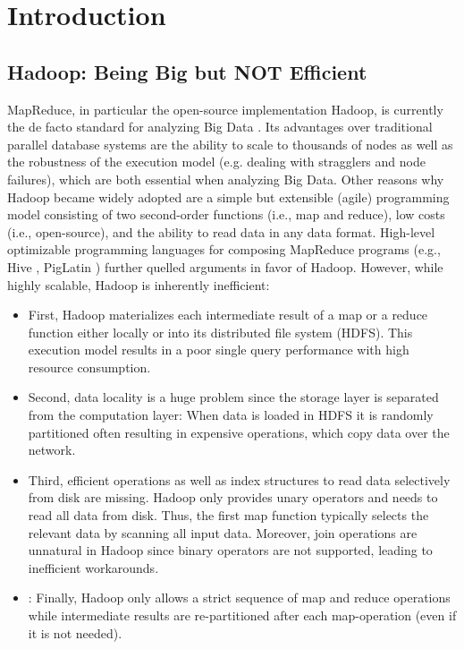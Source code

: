 \documentclass{sig-alternate}
\begin{document}
\section{Introduction}
\label{sec:intro}

\subsection{Hadoop: Being Big but NOT Efficient}
\label{sec:intro:hadoop}

MapReduce, in particular the open-source implementation Hadoop, is currently the de facto standard for analyzing Big Data \cite{MapReduce:CACM:08, Hadoop:OReilly:09}. Its advantages over traditional parallel database systems are the ability to scale to thousands of nodes as well as the robustness of the execution model (e.g. dealing with stragglers and node failures), which are both essential when analyzing Big Data. Other reasons why Hadoop became widely adopted are a simple but extensible (agile) programming model consisting of two second-order functions (i.e., map and reduce), low costs (i.e., open-source), and the ability to read data in any data format. High-level optimizable programming languages for composing MapReduce programs (e.g., Hive \cite{Hive:ICDE:2010}, PigLatin \cite{Pig:PVLDB:2009}) further quelled arguments in favor of Hadoop. However, while highly scalable, Hadoop is inherently inefficient:

\vspace{-1.5ex}
\begin{itemize}
\setlength{\itemsep}{-1.5pt}
\item First, Hadoop materializes each intermediate result of a map or a reduce function either locally or into its distributed file system (HDFS). This execution model results in a poor single query performance with high resource consumption. 
\item Second, data locality is a huge problem since the storage layer is separated from the computation layer: When data is loaded in HDFS it is randomly partitioned often resulting in expensive operations, which copy data over the network.
\item Third, efficient operations as well as index structures to read data selectively from disk are missing. Hadoop only provides unary operators and needs to read all data from disk. Thus, the first map function typically selects the relevant data by scanning all input data. Moreover, join operations are unnatural in Hadoop since binary operators are not supported, leading to inefficient workarounds. 
\item: Finally, Hadoop only allows a strict sequence of map and reduce operations while intermediate results are re-partitioned after each map-operation (even if it is not needed).
\end{itemize}
\vspace{-2ex}
\end{document}
